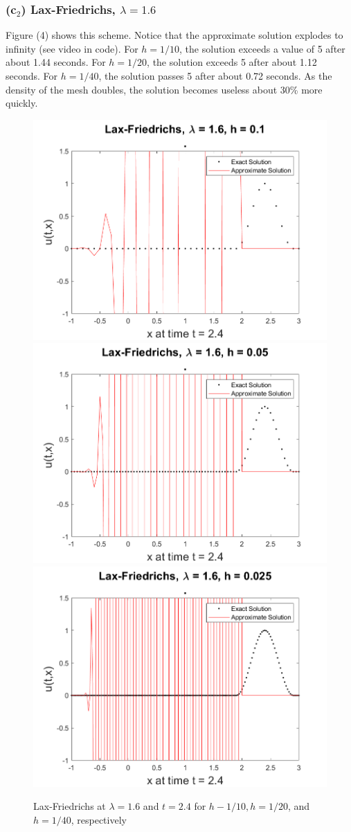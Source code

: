 \documentclass[12pt]{article}
\begin{document}
\subsubsection*{(c$_2$) Lax-Friedrichs, $\lambda = 1.6$}
\vspace{-1mm}
Figure (4) shows this scheme. Notice that the approximate solution explodes to infinity  (see video in code). For $h=1/10$, the solution exceeds a value of 5 after about 1.44 seconds. For $h=1/20$, the solution exceeds 5 after about 1.12 seconds. For $h=1/40$, the solution passes 5 after about 0.72 seconds. As the density of the mesh doubles, the solution becomes useless about 30\% more quickly.



\begin{figure}
	\centering
	\includegraphics[width=.6\linewidth]{./code/c_lax_friedrichs_1_10th-16.png}	\includegraphics[width=.6\linewidth]{./code/c_lax_friedrichs_1_20th-16.png}
	\includegraphics[width=.6\linewidth]{./code/c_lax_friedrichs_1_40th-16.png}
	\caption{Lax-Friedrichs at $\lambda = 1.6$ and $t=2.4$ for $h-1/10, h=1/20$, and $h=1/40$, respectively}
\end{figure}
\end{document}

